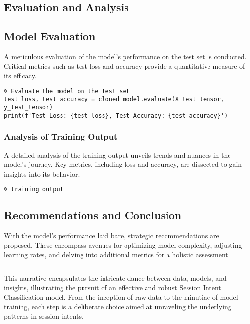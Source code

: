 \subsection{Evaluation and Analysis}
\subsection{Model Evaluation}
A meticulous evaluation of the model's performance on the test set is conducted. Critical metrics such as test loss and accuracy provide a quantitative measure of its efficacy.

\begin{lstlisting}
% Evaluate the model on the test set
test_loss, test_accuracy = cloned_model.evaluate(X_test_tensor, y_test_tensor)
print(f'Test Loss: {test_loss}, Test Accuracy: {test_accuracy}')
\end{lstlisting}

\subsubsection{Analysis of Training Output}
A detailed analysis of the training output unveils trends and nuances in the model's journey. Key metrics, including loss and accuracy, are dissected to gain insights into its behavior.

\begin{lstlisting}
% training output
\end{lstlisting}

\subsection{Recommendations and Conclusion}
With the model's performance laid bare, strategic recommendations are proposed. These encompass avenues for optimizing model complexity, adjusting learning rates, and delving into additional metrics for a holistic assessment.

\begin{lstlisting}[language=Python]
% Recommendations and conclusion 
\end{lstlisting}

This narrative encapsulates the intricate dance between data, models, and insights, illustrating the pursuit of an effective and robust Session Intent Classification model. From the inception of raw data to the minutiae of model training, each step is a deliberate choice aimed at unraveling the underlying patterns in session intents.